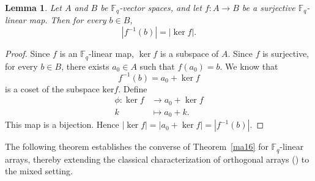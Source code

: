 \documentclass[11pt]{article}
\newtheorem{Definition and Notation}[Theorem]{Definition and Notation}
\newtheorem{Lemma}[Theorem]{Lemma}
\begin{document}
\begin{Lemma} \label{coset}
Let $A$ and $B$ be $\mathbb F_q$-vector spaces, and let $f: A \to B$ be a surjective $\mathbb F_q$-linear map. Then for every $b \in B$,
$$|f^{-1}(b)| = |\ker f|.$$
\end{Lemma}

\begin{proof}
Since $f$ is an $\mathbb F_q$-linear map, $\ker  f$ is a subspace of $A$. Since $f$ is surjective, for every $b \in B$, there exists $a_0 \in A$ such that $f(a_0) = b$. We know that 
$$f^{-1}(b) = a_0 + \ker f$$
is a coset of the subspace $\text{ker} f$.
Define
\begin{align*}
 \phi: \ker f &\to a_0 +\ker f  \\
k &\mapsto a_0 + k.
\end{align*}
This map is a bijection. Hence $|\ker f|=|a_0 +\ker f|=|f^{-1}(b)|.$
\end{proof}

The following theorem establishes the converse of Theorem~\ref{ma16} for $\mathbb{F}_q$-linear arrays, thereby extending the classical characterization of orthogonal arrays (\cite[Theorem 3.29]{HSS2012}) to the mixed setting.
\end{document}
